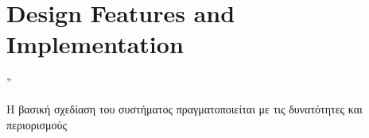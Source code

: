 \chapter{Design Features and Implementation} %
\label{chap:Chapter4}  %

\epigraph{” }{\textit{}}

Η βασική σχεδίαση του συστήματος πραγματοποιείται με τις δυνατότητες και περιορισμούς 

